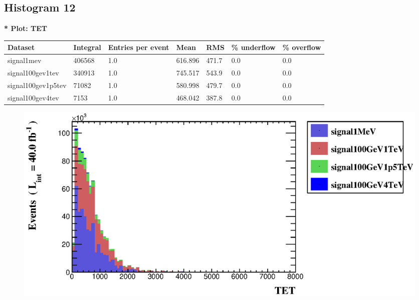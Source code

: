 \documentclass[a4paper, 10pt]{article}
\begin{document}
\subsection{ Histogram 12}

\textbf{* Plot: TET}\\
   \begin{table}[H]
  \begin{center}
    \begin{tabular}{|m{23.0mm}|m{23.0mm}|m{18.0mm}|m{19.0mm}|m{19.0mm}|m{19.0mm}|m{19.0mm}|}
      \hline
      {\cellcolor{yellow}         Dataset}& {\cellcolor{yellow}         Integral}& {\cellcolor{yellow}         Entries per event}& {\cellcolor{yellow}         Mean}& {\cellcolor{yellow}         RMS}& {\cellcolor{yellow}         \% underflow}& {\cellcolor{yellow}         \% overflow}\\
      \hline
      {\cellcolor{white}         signal1mev}& {\cellcolor{white}         406568}& {\cellcolor{white}         1.0}& {\cellcolor{white}         616.896}& {\cellcolor{white}         471.7}& {\cellcolor{green}         0.0}& {\cellcolor{green}         0.0}\\
      \hline
      {\cellcolor{white}         signal100gev1tev}& {\cellcolor{white}         340913}& {\cellcolor{white}         1.0}& {\cellcolor{white}         745.517}& {\cellcolor{white}         543.9}& {\cellcolor{green}         0.0}& {\cellcolor{green}         0.0}\\
      \hline
      {\cellcolor{white}         signal100gev1p5tev}& {\cellcolor{white}         71082}& {\cellcolor{white}         1.0}& {\cellcolor{white}         580.998}& {\cellcolor{white}         479.7}& {\cellcolor{green}         0.0}& {\cellcolor{green}         0.0}\\
      \hline
      {\cellcolor{white}         signal100gev4tev}& {\cellcolor{white}         7153}& {\cellcolor{white}         1.0}& {\cellcolor{white}         468.042}& {\cellcolor{white}         387.8}& {\cellcolor{green}         0.0}& {\cellcolor{green}         0.0}\\
\hline
    \end{tabular}
  \end{center}
\end{table}

\begin{figure}[H]
  \begin{center}
    \includegraphics[scale=0.45]{selection_11.eps}\\
\caption{   }
  \end{center}
\end{figure}
      
\end{document}

